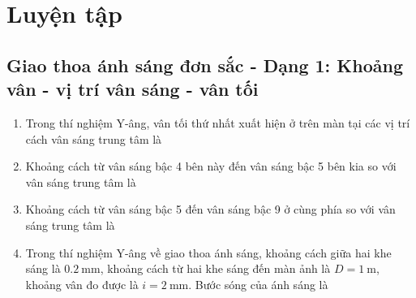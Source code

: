 \chapter{Luyện tập}
\section{Giao thoa ánh sáng đơn sắc - Dạng 1: Khoảng vân - vị trí vân sáng - vân tối}
\begin{enumerate}
	\item
	{
		Trong thí nghiệm Y-âng, vân tối thứ nhất xuất hiện ở trên màn tại các vị trí cách vân sáng trung tâm là
	}
	\item
	{
		Khoảng cách từ vân sáng bậc 4 bên này đến vân sáng bậc 5 bên kia so với vân sáng trung tâm là
	}
	\item
	{
		Khoảng cách từ vân sáng bậc 5 đến vân sáng bậc 9 ở cùng phía so với vân sáng trung tâm là
	}
	\item
	{
		Trong thí nghiệm Y-âng về giao thoa ánh sáng, khoảng cách giữa hai khe sáng là $\SI{0.2}{\milli \meter}$, khoảng cách từ hai khe sáng đến màn ảnh là $D=\SI{1}{\meter}$, khoảng vân đo được là $i=\SI{2}{\milli \meter}$. Bước sóng của ánh sáng là
}
\end{enumerate}
